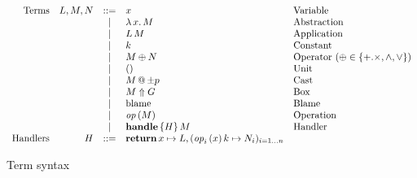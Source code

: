 \begin{figure}
$$
\begin{array}{rrcll}
 \text{Terms} &
 L, M, N & \ruledef & x & \text{Variable} \\
        && \rulealt & \lam{x}{M} & \text{Abstraction} \\
        && \rulealt & \app{L}{M} & \text{Application} \\
        && \rulealt & k & \text{Constant} \\
        && \rulealt & M \oplus N & \text{Operator ($\oplus \in \{+.\times,\wedge,\vee\}$)} \\
        && \rulealt & () & \text{Unit} \\
        && \rulealt & \cast{M}{{\pm p}} & \text{Cast} \\
        && \rulealt & \tbox{M}{G} & \text{Box} \\
        && \rulealt & \blame & \text{Blame} \\
        && \rulealt & \perform{\effop}{M} & \text{Operation} \\
        && \rulealt & \handle{H}{M} & \text{Handler} \\
 \text{Handlers} &
 H & \ruledef & \treturn{x} \mapsto L, \fori{i}{n}{\perform{\effop_i}{x} k \mapsto N_i} &
\end{array}
$$
\caption{Term syntax}
\label{fig:term-syntax}
\end{figure}

